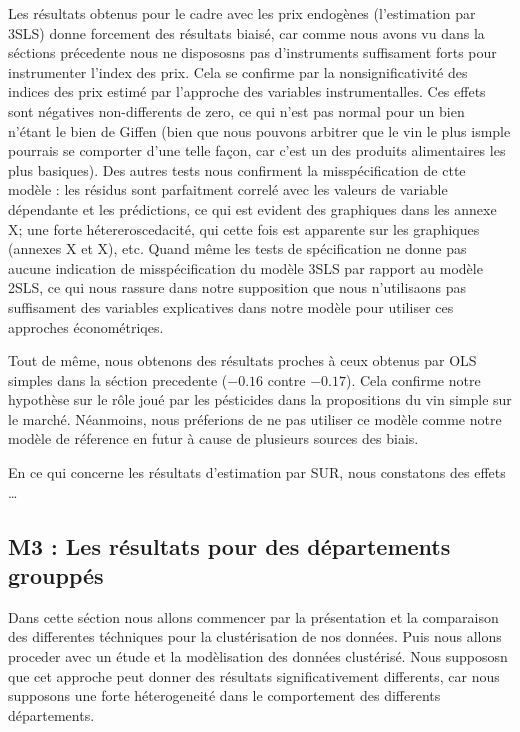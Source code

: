 \documentclass[11pt,]{article}
\begin{document}
Les résultats obtenus pour le cadre avec les prix endogènes
(l'estimation par 3SLS) donne forcement des résultats biaisé, car comme
nous avons vu dans la séctions précedente nous ne dispososns pas
d'instruments suffisament forts pour instrumenter l'index des prix. Cela
se confirme par la nonsignificativité des indices des prix estimé par
l'approche des variables instrumentalles. Ces effets sont négatives
non-differents de zero, ce qui n'est pas normal pour un bien n'étant le
bien de Giffen (bien que nous pouvons arbitrer que le vin le plus ismple
pourrais se comporter d'une telle façon, car c'est un des produits
alimentaires les plus basiques). Des autres tests nous confirment la
misspécification de ctte modèle : les résidus sont parfaitment correlé
avec les valeurs de variable dépendante et les prédictions, ce qui est
evident des graphiques dans les annexe X; une forte hétereroscedacité,
qui cette fois est apparente sur les graphiques (annexes X et X), etc.
Quand même les tests de spécification ne donne pas aucune indication de
misspécification du modèle 3SLS par rapport au modèle 2SLS, ce qui nous
rassure dans notre supposition que nous n'utilisaons pas suffisament des
variables explicatives dans notre modèle pour utiliser ces approches
économétriqes.

Tout de même, nous obtenons des résultats proches à ceux obtenus par OLS
simples dans la séction precedente (\(-0.16\) contre \(-0.17\)). Cela
confirme notre hypothèse sur le rôle joué par les pésticides dans la
propositions du vin simple sur le marché. Néanmoins, nous préferions de
ne pas utiliser ce modèle comme notre modèle de réference en futur à
cause de plusieurs sources des biais.

En ce qui concerne les résultats d'estimation par SUR, nous constatons
des effets \ldots{}

\hypertarget{m3-les-resultats-pour-des-departements-grouppes}{%
\subsection{M3 : Les résultats pour des départements
grouppés}\label{m3-les-resultats-pour-des-departements-grouppes}}

Dans cette séction nous allons commencer par la présentation et la
comparaison des differentes téchniques pour la clustérisation de nos
données. Puis nous allons proceder avec un étude et la modèlisation des
données clustérisé. Nous suppososn que cet approche peut donner des
résultats significativement differents, car nous supposons une forte
héterogeneité dans le comportement des differents départements.
\end{document}

